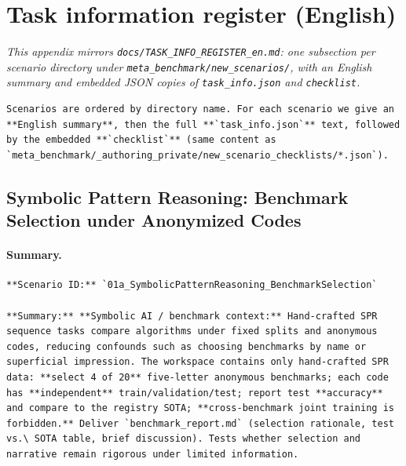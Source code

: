 
\section{Task information register (English)}
\label{sec:appendix-task-info-register-en}

\noindent\emph{This appendix mirrors \texttt{docs/TASK\_INFO\_REGISTER\_en.md}: one subsection per scenario directory under \texttt{meta\_benchmark/new\_scenarios/}, with an English summary and embedded JSON copies of \texttt{task\_info.json} and \texttt{checklist}.}

\begin{lstlisting}[basicstyle=\ttfamily\footnotesize,breaklines=true]
Scenarios are ordered by directory name. For each scenario we give an **English summary**, then the full **`task_info.json`** text, followed by the embedded **`checklist`** (same content as `meta_benchmark/_authoring_private/new_scenario_checklists/*.json`).
\end{lstlisting}

\subsection{Symbolic Pattern Reasoning: Benchmark Selection under Anonymized Codes}

\paragraph{Summary.}
\begin{lstlisting}[basicstyle=\ttfamily\footnotesize,breaklines=true,breakatwhitespace=true]
**Scenario ID:** `01a_SymbolicPatternReasoning_BenchmarkSelection`

**Summary:** **Symbolic AI / benchmark context:** Hand-crafted SPR sequence tasks compare algorithms under fixed splits and anonymous codes, reducing confounds such as choosing benchmarks by name or superficial impression. The workspace contains only hand-crafted SPR data: **select 4 of 20** five-letter anonymous benchmarks; each code has **independent** train/validation/test; report test **accuracy** and compare to the registry SOTA; **cross-benchmark joint training is forbidden.** Deliver `benchmark_report.md` (selection rationale, test vs.\ SOTA table, brief discussion). Tests whether selection and narrative remain rigorous under limited information.
\end{lstlisting}

